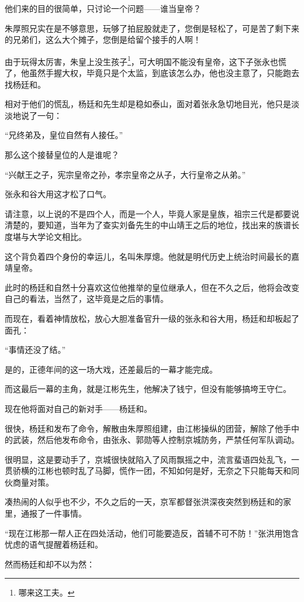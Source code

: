 \begin{multicols}{\theparacolNo}
		他们来的目的很简单，只讨论一个问题——谁当皇帝？

		朱厚照兄实在是不够意思，玩够了拍屁股就走了，您倒是轻松了，可是苦了剩下来的兄弟们，这么大个摊子，您倒是给留个接手的人啊！

		由于玩得太厉害，朱皇上没生孩子\footnote{哪来这工夫。}，可大明国不能没有皇帝，这下子张永也慌了，他虽然手握大权，毕竟只是个太监，到底该怎么办，他也没主意了，只能跑去找杨廷和。

		相对于他们的慌乱，杨廷和先生却是稳如泰山，面对着张永急切地目光，他只是淡淡地说了一句：

		“兄终弟及，皇位自然有人接任。”

		那么这个接替皇位的人是谁呢？

		“兴献王之子，宪宗皇帝之孙，孝宗皇帝之从子，大行皇帝之从弟。”

		张永和谷大用这才松了口气。

		请注意，以上说的不是四个人，而是一个人，毕竟人家是皇族，祖宗三代是都要说清楚的，要知道，当年为了查实刘备先生的中山靖王之后的地位，找出来的族谱长度堪与大学论文相比。

		这个背负着四个身份的幸运儿，名叫朱厚熜。他就是明代历史上统治时间最长的嘉靖皇帝。

		此时的杨廷和自然十分喜欢这位他推举的皇位继承人，但在不久之后，他将会改变自己的看法，当然了，这毕竟是之后的事情。

		而现在，看着神情放松，放心大胆准备官升一级的张永和谷大用，杨廷和却板起了面孔：

		“事情还没了结。”

		是的，正德年间的这一场大戏，还差最后的一幕才能完成。

		而这最后一幕的主角，就是江彬先生，他解决了钱宁，但没有能够搞垮王守仁。

		现在他将面对自己的新对手——杨廷和。

		很快，杨廷和发布了命令，解散由朱厚照组建，由江彬操纵的团营，解除了他手中的武装，然后他发布命令，由张永、郭勋等人控制京城防务，严禁任何军队调动。

		很明显，这是要动手了，京城很快就陷入了风雨飘摇之中，流言蜚语四处乱飞，一贯骄横的江彬也顿时乱了马脚，慌作一团，不知如何是好，无奈之下只能每天和同伙商量对策。

		凑热闹的人似乎也不少，不久之后的一天，京军都督张洪深夜突然到杨廷和的家里，通报了一件事情。

		“现在江彬那一帮人正在四处活动，他们可能要造反，首辅不可不防！”张洪用饱含忧虑的语气提醒着杨廷和。

		然而杨廷和却不以为然：


\end{multicols}
